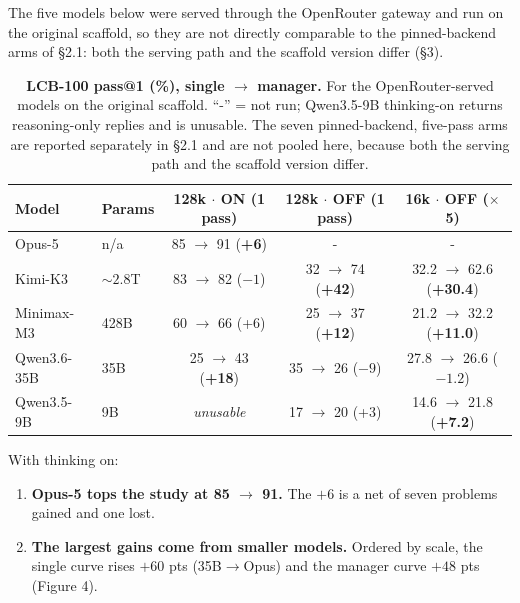 \documentclass[11pt]{article}
\begin{document}
The five models below were served through the OpenRouter gateway and run on the
original scaffold, so they are not directly comparable to the pinned-backend arms of
\S2.1: both the serving path and the scaffold version differ (\S3).

\begin{table}[htbp]
\centering
\caption{\textbf{LCB-100 pass@1 (\%), single $\to$ manager.} For the OpenRouter-served
models on the original scaffold. ``-'' = not run; Qwen3.5-9B thinking-on returns
reasoning-only replies and is unusable. The seven pinned-backend, five-pass arms are reported separately in
\S2.1 and are not pooled here, because both the serving path and the scaffold version
differ.}
\small
\begin{tabular}{@{}llccc@{}}
\toprule
\textbf{Model} & \textbf{Params} & \textbf{128k $\cdot$ ON (1 pass)} &
\textbf{128k $\cdot$ OFF (1 pass)} & \textbf{16k $\cdot$ OFF ($\times$5)} \\
\midrule
Opus-5        & n/a            & 85 $\to$ 91 (\textbf{+6})            & -                       & - \\
Kimi-K3       & ${\sim}2.8$T   & 83 $\to$ 82 ($-1$)                   & 32 $\to$ 74 (\textbf{+42}) & 32.2 $\to$ 62.6 (\textbf{+30.4}) \\
Minimax-M3    & 428B           & 60 $\to$ 66 (+6)                     & 25 $\to$ 37 (\textbf{+12}) & 21.2 $\to$ 32.2 (\textbf{+11.0}) \\
Qwen3.6-35B   & 35B            & 25 $\to$ 43 (\textbf{+18})           & 35 $\to$ 26 ($-9$)         & 27.8 $\to$ 26.6 ($-1.2$) \\
Qwen3.5-9B    & 9B             & \textit{unusable}                    & 17 $\to$ 20 (+3)           & 14.6 $\to$ 21.8 (\textbf{+7.2}) \\
\bottomrule
\end{tabular}
\end{table}



With thinking on:

\begin{enumerate}
  \item \textbf{Opus-5 tops the study at 85 $\to$ 91.} The $+6$ is a net of seven problems
  gained and one lost.

  \item \textbf{The largest gains come from smaller models.} Ordered by scale, the single
  curve rises $+60$ pts (35B$\to$Opus) and the manager curve $+48$ pts (Figure 4).
\end{enumerate}
\end{document}

